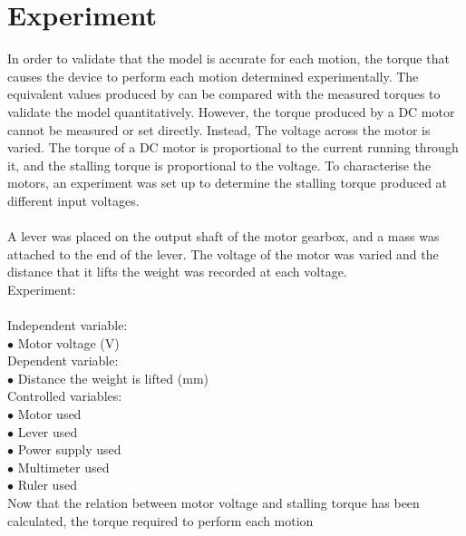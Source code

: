 \chapter{Experiment}
In order to validate that the model is accurate for each motion, the torque that causes the device to perform each motion determined experimentally. The equivalent values produced by can be compared with the measured torques to validate the model quantitatively. However, the torque produced by a DC motor cannot be measured or set directly. Instead, The voltage across the motor is varied. The torque of a DC motor is proportional to the current running through it, and the stalling torque is proportional to the voltage. To characterise the motors, an experiment was set up to determine the stalling torque produced at different input voltages. \\
\\
A lever was placed on the output shaft of the motor gearbox, and a mass was attached to the end of the lever. The voltage of the motor was varied and the distance that it lifts the weight was recorded at each voltage.\\
Experiment:\\\\

Independent variable:\\
$\bullet$ Motor voltage (V)\\
Dependent variable:\\
$\bullet$ Distance the weight is lifted (mm)\\
Controlled variables:\\
$\bullet$ Motor used\\
$\bullet$ Lever used\\
$\bullet$ Power supply used\\
$\bullet$ Multimeter used\\
$\bullet$ Ruler used\\


Now that the relation between motor voltage and stalling torque has been calculated, the torque required to perform each motion 
